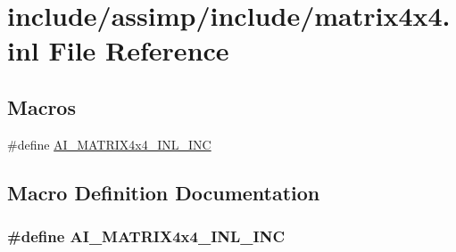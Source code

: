 \hypertarget{matrix4x4_8inl}{\section{include/assimp/include/matrix4x4.inl File Reference}
\label{matrix4x4_8inl}
}
\subsection*{Macros}
\begin{DoxyCompactItemize}
\item 
\#define \hyperlink{matrix4x4_8inl_aff41ff37c5b66dda7952689bc0a3504f}{A\-I\-\_\-\-M\-A\-T\-R\-I\-X4x4\-\_\-\-I\-N\-L\-\_\-\-I\-N\-C}
\end{DoxyCompactItemize}


\subsection{Macro Definition Documentation}
\hypertarget{matrix4x4_8inl_aff41ff37c5b66dda7952689bc0a3504f}{
\subsubsection[{A\-I\-\_\-\-M\-A\-T\-R\-I\-X4x4\-\_\-\-I\-N\-L\-\_\-\-I\-N\-C}]{\setlength{\rightskip}{0pt plus 5cm}\#define A\-I\-\_\-\-M\-A\-T\-R\-I\-X4x4\-\_\-\-I\-N\-L\-\_\-\-I\-N\-C}}\label{matrix4x4_8inl_aff41ff37c5b66dda7952689bc0a3504f}
